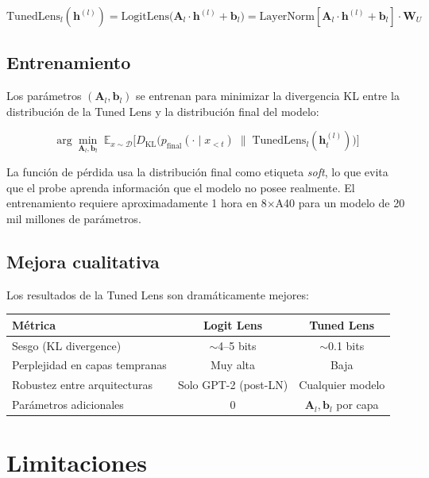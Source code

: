 \documentclass[11pt,a4paper]{report}
\theoremstyle{definition}
\begin{document}
\[
\text{TunedLens}_l(\mathbf{h}^{(l)}) = \text{LogitLens}\!\big(\mathbf{A}_l \cdot \mathbf{h}^{(l)} + \mathbf{b}_l\big) = \text{LayerNorm}[\mathbf{A}_l \cdot \mathbf{h}^{(l)} + \mathbf{b}_l] \cdot \mathbf{W}_U
\]

\subsection{Entrenamiento}

Los parámetros $(\mathbf{A}_l, \mathbf{b}_l)$ se entrenan para minimizar la divergencia KL entre la distribución de la Tuned Lens y la distribución final del modelo:

\[
\arg\min_{\mathbf{A}_l, \mathbf{b}_l} \; \mathbb{E}_{x \sim \mathcal{D}}\Big[ D_{\text{KL}}\big( p_{\text{final}}(\cdot \mid x_{<t}) \;\|\; \text{TunedLens}_l(\mathbf{h}^{(l)}_t) \big) \Big]
\]

La función de pérdida usa la distribución final como etiqueta \emph{soft}, lo que evita que el probe aprenda información que el modelo no posee realmente. El entrenamiento requiere aproximadamente 1 hora en 8$\times$A40 para un modelo de 20 mil millones de parámetros.

\subsection{Mejora cualitativa}

Los resultados de la Tuned Lens son dramáticamente mejores:

\begin{center}
\begin{tabular}{lcc}
\toprule
\textbf{Métrica} & \textbf{Logit Lens} & \textbf{Tuned Lens} \\
\midrule
Sesgo (KL divergence) & $\sim$4--5 bits & $\sim$0.1 bits \\
Perplejidad en capas tempranas & Muy alta & Baja \\
Robustez entre arquitecturas & Solo GPT-2 (post-LN) & Cualquier modelo \\
Parámetros adicionales & 0 & $\mathbf{A}_l, \mathbf{b}_l$ por capa \\
\bottomrule
\end{tabular}
\end{center}

\section{Limitaciones}
\label{sec:logit-lens-lim}
\end{document}
